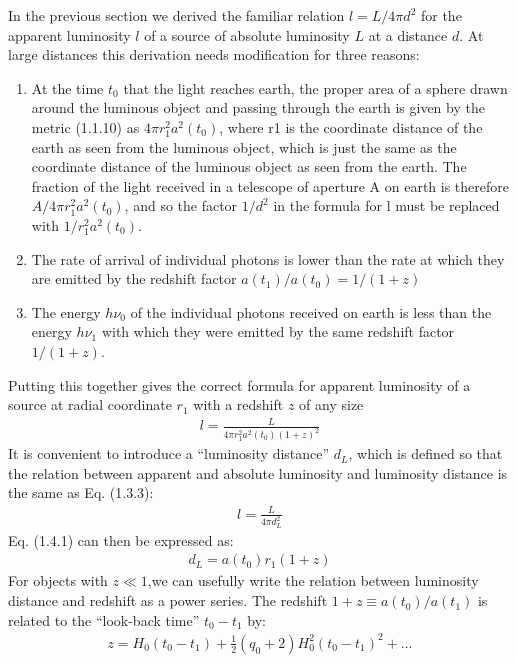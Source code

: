 \documentclass[11pt]{ltjsarticle}
\theoremstyle{plain}
\theoremstyle{break}
\begin{document}
In the previous section we derived the familiar relation $l = L/4\pi d^2$ for the apparent luminosity $l$ of a source of absolute luminosity $L$ at a distance $d$. At large distances this derivation needs modification for three reasons:
\begin{enumerate}
  \item
  At the time $t_0$ that the light reaches earth, the proper area of a sphere drawn around the luminous object and passing through the earth is given by the metric (1.1.10)%
  as $4\pi r_1^2 a^2(t_0)$, where r1 is the coordinate distance of the earth as seen from the luminous object, which is just the same as the coordinate distance of the luminous object as seen from the earth. The fraction of the light received in a telescope of aperture A on earth is therefore $A/4\pi r_1^2 a^2(t_0)$, and so the factor $1/d^2$ in the formula for l must be replaced with $1/r_1^2a^2(t_0)$.
  \item
  The rate of arrival of individual photons is lower than the rate at which they are emitted by the redshift factor $a(t_1)/a(t_0) = 1/(1 + z)$
  \item
  The energy $h\nu_0$ of the individual photons received on earth is less than the energy $h\nu_1$ with which they were emitted by the same redshift factor $1/(1 + z)$.
\end{enumerate}
Putting this together gives the correct formula for apparent luminosity of a source at radial coordinate $r_1$ with a redshift $z$ of any size
\begin{align}
  l=\frac{L}{4 \pi r_{1}^{2} a^{2}\left(t_{0}\right)(1+z)^{2}}
\end{align}
It is convenient to introduce a “luminosity distance” $d_L$, which is defined so that the relation between apparent and absolute luminosity and luminosity distance is the same as Eq. (1.3.3):
\begin{align}
  l=\frac{L}{4 \pi d_{L}^{2}}
\end{align}
Eq. (1.4.1) can then be expressed as:
\begin{align}
  d_{L}=a\left(t_{0}\right) r_{1}(1+z)
\end{align}
For objects with $z\ll1$,we can usefully write the relation between luminosity distance and redshift as a power series.
The redshift $1 + z \equiv a(t_0)/a(t_1)$ is related to the “look-back time” $t_0-t_1$ by:
\begin{align}
  z=H_{0}\left(t_{0}-t_{1}\right)+\frac{1}{2}\left(q_{0}+2\right) H_{0}^{2}\left(t_{0}-t_{1}\right)^{2}+\ldots
\end{align}
\end{document}
